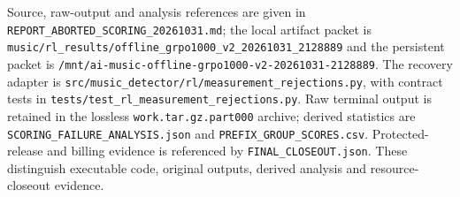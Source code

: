 Source, raw-output and analysis references are given in
\texttt{REPORT\_ABORTED\_SCORING\_20261031.md}; the local artifact packet is
\texttt{music/rl\_results/offline\_grpo1000\_v2\_20261031\_2128889} and the
persistent packet is
\texttt{/mnt/ai-music-offline-grpo1000-v2-20261031-2128889}.
The recovery adapter is \texttt{src/music\_detector/rl/measurement\_rejections.py},
with contract tests in \texttt{tests/test\_rl\_measurement\_rejections.py}.
Raw terminal output is retained in the lossless \texttt{work.tar.gz.part000}
archive; derived statistics are \texttt{SCORING\_FAILURE\_ANALYSIS.json} and
\texttt{PREFIX\_GROUP\_SCORES.csv}. Protected-release and billing evidence is
referenced by \texttt{FINAL\_CLOSEOUT.json}. These distinguish executable code,
original outputs, derived analysis and resource-closeout evidence.

